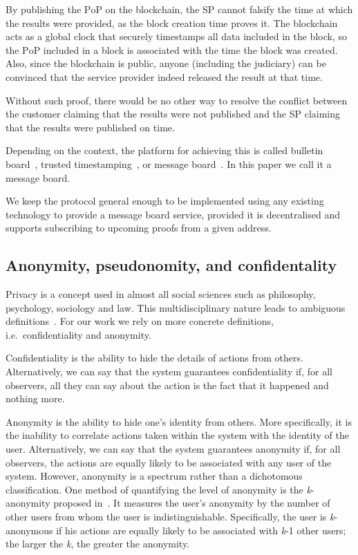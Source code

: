 \documentclass[pdftex,twocolumn,epjc3]{svjour3}
\begin{document}
{By publishing the $\mathrm{PoP}$ on the blockchain, the SP cannot falsify the time at which the results were provided, as the block creation time proves it. The blockchain acts as a global clock that securely timestamps all data included in the block, so the $\mathrm{PoP}$ included in a block is associated with the time the block was created. Also, since the blockchain is public, anyone (including the judiciary) can be convinced that the service provider indeed released the result at that time.

Without such proof, there would be no other way to resolve the conflict between the customer claiming that the results were not published and the SP claiming that the results were published on time.

Depending on the context, the platform for achieving this is called bulletin board~\cite{achenbachImprovedCoercionresistantElectronic2015}, trusted timestamping~\cite{gippDecentralizedTrustedTimestamping2015}, or message board~\cite{hinarejosSolutionSecureCertified2019}. In this paper we call it a message board.

We keep the protocol general enough to be implemented using any existing technology to provide a message board service, provided it is decentralised and supports subscribing to upcoming proofs from a given address.

\subsection{Anonymity, pseudonomity, and confidentality}\label{sec:pseudo-anon}

Privacy is a concept used in almost all social sciences such as philosophy, psychology, sociology and law. This multidisciplinary nature leads to ambiguous definitions~\cite{smithInformationPrivacyResearch2011}. For our work we rely on more concrete definitions, i.e.~confidentiality and anonymity.

Confidentiality is the ability to hide the details of actions from others. Alternatively, we can say that the system guarantees confidentiality if, for all observers, all they can say about the action is the fact that it happened and nothing more.

Anonymity is the ability to hide one's identity from others. More specifically, it is the inability to correlate actions taken within the system with the identity of the user. Alternatively, we can say that the system guarantees anonymity if, for all observers, the actions are equally likely to be associated with any user of the system. However, anonymity is a spectrum rather than a dichotomous classification. One method of quantifying the level of anonymity is the \textit{k}-anonymity proposed in~\cite{sweeneyKanonymityModelProtecting2002}. It measures the user's anonymity by the number of other users from whom the user is indistinguishable. Specifically, the user is \textit{k}-anonymous if his actions are equally likely to be associated with \textit{k}-1 other users; the larger the \textit{k}, the greater the anonymity.

}
\end{document}
